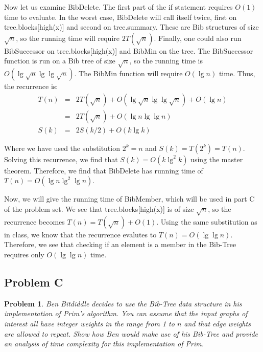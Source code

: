\documentclass[psamsfonts]{amsart}
\newtheorem{prob}{Problem}[section]
\newenvironment{sol}{{\bfseries Solution}}{\qedsymbol}
\theoremstyle{definition}
\theoremstyle{remark}
\numberwithin{equation}{section}
\begin{document}
\begin{sol}
Now let us examine BibDelete. The first part of the if statement requires $O(1)$ time to evaluate. In the worst case, BibDelete will call itself twice, first on tree.blocks[high(x)] and second on tree.summary. These are Bib structures of size $\sqrt{n}$, so the running time will require $2 T(\sqrt{n})$. Finally, one could also run BibSuccessor on tree.blocks[high(x)] and BibMin on the tree. The BibSuccessor function is run on a Bib tree of size $\sqrt{n}$, so the running time is $O(\lg \sqrt{n} \lg \lg \sqrt{n})$. The BibMin function will require $O(\lg n)$ time. Thus, the recurrence is:
\begin{eqnarray}
T(n) &=& 2 T(\sqrt{n}) + O(\lg \sqrt{n} \lg \lg \sqrt{n}) + O(\lg n) \\
&=& 2T(\sqrt{n}) + O(\lg n \lg \lg n) \\
S(k) &=& 2 S(k/2) + O(k \lg k)
\end{eqnarray}

Where we have used the substitution $2^k = n$ and $S(k) = T(2^k) = T(n)$. Solving this recurrence, we find that $S(k) = O(k \lg^2 k)$ using the master theorem. Therefore, we find that BibDelete has running time of $T(n) = O(\lg n \lg^2 \lg n)$. 

Now, we will give the running time of BibMember, which will be used in part C of the problem set. We see that tree.blocks[high(x)] is of size $\sqrt{n}$, so the recurrence becomes $T(n) = T(\sqrt{n}) + O(1)$. Using the same substitution as in class, we know that the recurrence evalutes to $T(n) = O(\lg \lg n)$. Therefore, we see that checking if an element is a member in the Bib-Tree requires only $O(\lg \lg n)$ time. 
\end{sol}

\subsection{Problem C}

\begin{prob}
Ben Bitdiddle decides to use the Bib-Tree data structure in his implementation of Prim's algorithm. You can assume that the input graphs of interest all have integer weights in the range from 1 to $n$ and that edge weights are allowed to repeat. Show how Ben would make use of his Bib-Tree and provide an analysis of time complexity for this implementation of Prim.
\end{prob}
\end{document}
